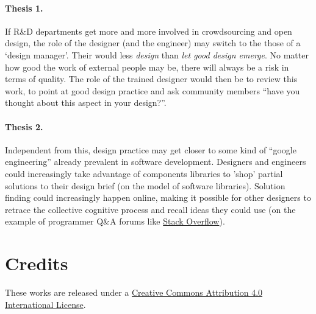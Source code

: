 \documentclass{article}
\begin{document}
\paragraph{Thesis 1.}If R\&D departments get more and more involved in crowdsourcing and open design, the role of the designer (and the engineer) may switch to the those of a `design manager'. Their would less \emph{design} than \emph{let good design emerge}. No matter how good the work of external people may be, there will always be a risk in terms of quality. The role of the trained designer would then be to review this work, to point at good design practice and ask community members ``have you thought about this aspect in your design?''.

\paragraph{Thesis 2.}Independent from this, design practice may get closer to some kind of ``google engineering'' already prevalent in software development. Designers and engineers could increasingly take advantage of components libraries to 'shop' partial solutions to their design brief (on the model of software libraries). Solution finding could increasingly happen online, making it possible for other designers to retrace the collective cognitive process and recall ideas they could use (on the example of programmer Q\&A forums like \href{https://en.wikipedia.org/wiki/Stack_Overflow}{Stack Overflow}).

\section*{Credits}
\label{sec:credits}
These works are released under a \href{https://creativecommons.org/licenses/by/4.0/}{Creative Commons Attribution 4.0 International License}. 

\begin{comment}
https://www.researchgate.net/publication/320601945_Distributed_economies_through_open_design_and_digital_manufacturing
\end{comment}



\end{document}
